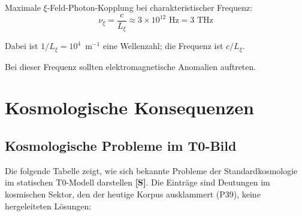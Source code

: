 	Maximale $\xi$-Feld-Photon-Kopplung bei charakteristischer Frequenz:
	\begin{equation}
		\nu_\xi = \frac{c}{L_\xi} \approx 3 \times 10^{12} \text{ Hz} = 3 \text{ THz}
	\end{equation}

	Dabei ist $1/L_\xi = 10^4$~m$^{-1}$ eine Wellenzahl; die Frequenz ist $c/L_\xi$.
	
	Bei dieser Frequenz sollten elektromagnetische Anomalien auftreten.
	
	\section{Kosmologische Konsequenzen}
	
	\subsection{Kosmologische Probleme im T0-Bild}
	
	Die folgende Tabelle zeigt, wie sich bekannte Probleme der Standardkosmologie im statischen T0-Modell darstellen \textbf{[S]}. Die Einträge sind Deutungen im kosmischen Sektor, den der heutige Korpus ausklammert (P39), keine hergeleiteten Lösungen:
	
\begin{table}[ht]
	\centering
	\caption{Kosmologische Probleme: Standard vs. T0}
	\label{tab:cosmological_problems}
\end{table}
	
